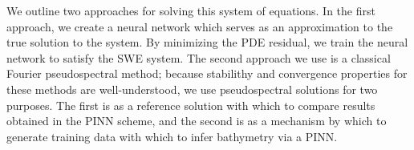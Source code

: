 We outline two approaches for solving this system of equations. In the first approach, we create a neural network which 
serves as an approximation to the true solution to the system. By minimizing the PDE residual, we train the neural 
network to satisfy the SWE system. The second approach we use is a classical Fourier pseudospectral method; because 
stabilithy and convergence properties for these methods are well-understood, we use pseudospectral solutions for two 
purposes. The first is as a reference solution with which to compare results obtained in the PINN scheme, and
the second is as a mechanism by which to generate training data with which to infer bathymetry via a PINN. 
